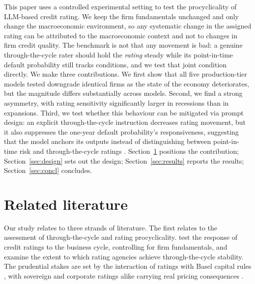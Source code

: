 \documentclass[a4paper,fleqn]{cas-sc}
\begin{document}
This paper uses a controlled experimental setting to test the procyclicality of LLM-based credit
rating. We keep the firm fundamentals unchanged and only change the macroeconomic environment, so any
systematic change in the assigned rating can be attributed to the macroeconomic context and not to
changes in firm credit quality. The benchmark is not that any movement is bad: a genuine
through-the-cycle rater should hold the \emph{rating} steady while its point-in-time default
probability still tracks conditions, and we test that joint condition directly. We make three
contributions. We first show that all five production-tier models tested downgrade identical firms as
the state of the economy deteriorates, but the magnitude differs substantially across models. Second,
we find a strong asymmetry, with rating sensitivity significantly larger in recessions than in
expansions. Third, we test whether this behaviour can be mitigated via prompt design: an explicit
through-the-cycle instruction decreases rating movement, but it also suppresses the one-year default
probability's responsiveness, suggesting that the model anchors its outputs instead of distinguishing
between point-in-time risk and through-the-cycle ratings \citep{tversky1974}. Section~\ref{sec:lit}
positions the contribution; Section~\ref{sec:design} sets out the design; Section~\ref{sec:results}
reports the results; Section~\ref{sec:concl} concludes.

\section{Related literature}\label{sec:lit}
Our study relates to three strands of literature. The first relates to the assessment of
through-the-cycle and rating procyclicality. \citet{amato2004} test the response of credit ratings to
the business cycle, controlling for firm fundamentals, and \citet{loffler2004,loffler2013} examine the
extent to which rating agencies achieve through-the-cycle stability. The prudential stakes are set by
the interaction of ratings with Basel capital rules \citep{kashyap2004,gordy2006}, with sovereign and
corporate ratings alike carrying real pricing consequences \citep{cantor1996}.
\end{document}
